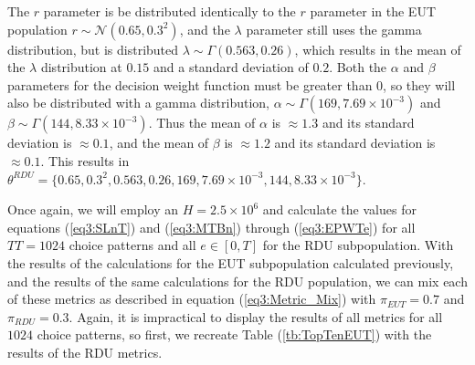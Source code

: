\documentclass[../main.tex]{subfiles}
\begin{document}
The $r$ parameter is be distributed identically to the $r$ parameter in the EUT population $r \sim \mathcal{N}(0.65 , 0.3^2 )$, and the $\lambda$ parameter still uses the gamma distribution, but is distributed $\lambda \sim \Gamma(0.563 , 0.26)$, which results in the mean of the $\lambda$ distribution at $0.15$ and a standard deviation of $0.2$.{\footnotemark}
Both the $\alpha$ and $\beta$ parameters for the decision weight function must be greater than $0$, so they will also be distributed with a gamma distribution, $\alpha \sim \Gamma(169 , 7.69 \times 10^{-3})$ and $\beta \sim \Gamma(144 , 8.33 \times 10^{-3})$.
Thus the mean of $\alpha$ is $\approx 1.3$ and its standard deviation is $\approx 0.1$, and the mean of $\beta$ is $\approx 1.2$ and its standard deviation is $\approx 0.1$.
This results in $\theta^{RDU} = \lbrace  0.65 ,0.3^2,  0.563 , 0.26 , 169 , 7.69 \times 10^{-3} , 144 , 8.33 \times 10^{-3} \rbrace$.

\addtocounter{footnote}{-1}

Once again, we will employ an $H = 2.5 \times 10^6$ and calculate the values for equations (\ref{eq3:SLnT}) and (\ref{eq3:MTBn}) through (\ref{eq3:EPWTe}) for all $\mathit{TT} =1024$ choice patterns and all $e \in[0,T]$ for the RDU subpopulation.
With the results of the calculations for the EUT subpopulation calculated previously, and the results of the same calculations for the RDU population, we can mix each of these metrics as described in equation (\ref{eq3:Metric_Mix}) with $\pi_{EUT} = 0.7$ and $\pi_{RDU} = 0.3$.
Again, it is impractical to display the results of all metrics for all $1024$ choice patterns, so first, we recreate Table (\ref{tb:TopTenEUT}) with the results of the RDU metrics.
\end{document}
